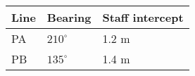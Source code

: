 \begin{center}
\begin{tabular}{|l|l|l|}
\hline
\textbf{Line} & \textbf{Bearing} & \textbf{Staff intercept} \\ \hline
PA & $210^{\circ}$ & 1.2 m \\ \hline
PB & $135^{\circ}$ & 1.4 m \\ \hline
\end{tabular}
\end{center}